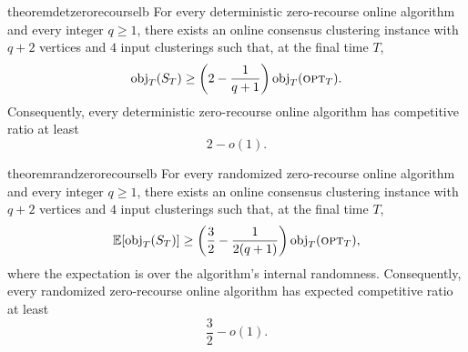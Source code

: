 \begin{restatable}{theorem}{detzerorecourselb}
\label{thm:det-zero-recourse-lb}
For every deterministic zero-recourse online algorithm and every integer \(q\ge 1\), there exists an online consensus clustering instance with \(q+2\) vertices and \(4\) input clusterings such that, at the final time \(T\),
\[
    \text{obj}_T(S_T)
    \ge
    \left(2-\frac{1}{q+1}\right)\text{obj}_T(\textsc{opt}_T).
\]
Consequently, every deterministic zero-recourse online algorithm has competitive ratio at least
\[
    2-o(1).
\]
\end{restatable}

\begin{restatable}{theorem}{randzerorecourselb}
\label{thm:rand-zero-recourse-lb}
For every randomized zero-recourse online algorithm and every integer \(q\ge 1\), there exists an online consensus clustering instance with \(q+2\) vertices and \(4\) input clusterings such that, at the final time \(T\),
\[
    \mathbb E[\text{obj}_T(S_T)]
    \ge
    \left(
        \frac32-\frac{1}{2(q+1)}
    \right)\text{obj}_T(\textsc{opt}_T),
\]
where the expectation is over the algorithm's internal randomness. Consequently, every randomized zero-recourse online algorithm has expected competitive ratio at least
\[
    \frac32-o(1).
\]
\end{restatable}

